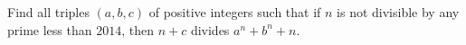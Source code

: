 Find all triples $(a,b,c)$ of positive integers such that if $n$ is not divisible by any prime less than $2014$, then $n+c$ divides $a^n+b^n+n$.

